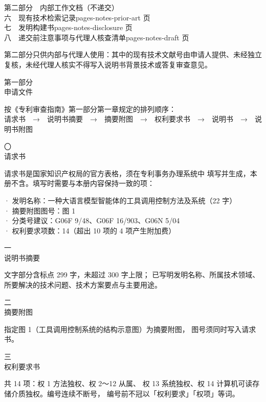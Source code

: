 \documentclass[12pt,UTF8]{ctexart}
\newcommand{\divider}[3]{%
  \clearpage
  \null\vspace*{0.22\textheight}
  \begin{center}
    {\zihao{5}\color{black!55}#1}\\[6mm]
    {\zihao{2}\cbf #2}\\[8mm]
    \begin{minipage}{0.76\linewidth}\centering\zihao{5}#3\end{minipage}
  \end{center}
  \clearpage}
\newcommand{\includedoc}[4]{%
  \divider{#1}{#2}{#3}%
  }
\newcommand{\docpages}[1]{\csname pages-#1\endcsname}
\begin{document}
{\cbf 第二部分　内部工作文档（不递交）}\\[3mm]
\hspace*{2em}六　现有技术检索记录\hfill \docpages{notes-prior-art} 页\\[2mm]
\hspace*{2em}七　发明构建书\hfill \docpages{notes-disclosure} 页\\[2mm]
\hspace*{2em}八　递交前注意事项与代理人核查清单\hfill \docpages{notes-draft} 页\\[10mm]

\begin{minipage}{\linewidth}\color{black!70}
  第二部分只供内部与代理人使用：其中的现有技术文献号由申请人提供、未经独立
  复核，未经代理人核实不得写入说明书背景技术或答复审查意见。
\end{minipage}
\clearpage

\divider{第一部分}{申请文件}{按《专利审查指南》第一部分第一章规定的排列顺序：\\[2mm]
  请求书　→　说明书摘要　→　摘要附图　→　权利要求书　→　说明书　→　说明书附图}

\divider{〇}{请求书}{请求书是国家知识产权局的官方表格，须在专利事务办理系统中
  填写并生成，本册不含。填写时需要与本册内容保持一致的项：\\[4mm]
  \begin{flushleft}
  \hspace*{1em}· 发明名称：一种大语言模型智能体的工具调用控制方法及系统（22 字）\\[1.5mm]
  \hspace*{1em}· 摘要附图图号：图 1\\[1.5mm]
  \hspace*{1em}· 分类号建议：G06F 9/48、G06F 16/903、G06N 5/04\\[1.5mm]
  \hspace*{1em}· 权利要求项数：14（超出 10 项的 4 项产生附加费）
  \end{flushleft}}

\includedoc{一}{说明书摘要}{文字部分含标点 299 字，未超过 300 字上限；
  已写明发明名称、所属技术领域、所要解决的技术问题、技术方案要点与主要用途。}
  {.build/abstract.pdf}

\includedoc{二}{摘要附图}{指定图 1（工具调用控制系统的结构示意图）为摘要附图，
  图号须同时写入请求书。}
  {.build/abstract-figure.pdf}

\includedoc{三}{权利要求书}{共 14 项：权 1 方法独权、权 2～12 从属、
  权 13 系统独权、权 14 计算机可读存储介质独权。编号连续不断号，
  编号前不冠以「权利要求」「权项」等词。}
  {.build/claims.pdf}
\end{document}

